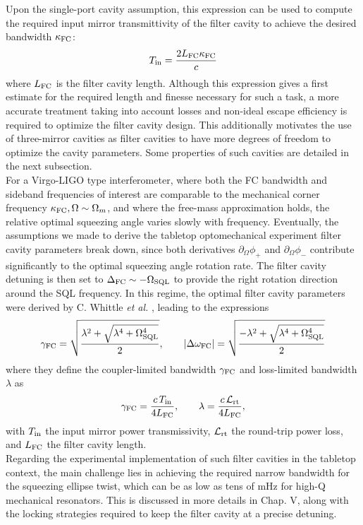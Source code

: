 Upon the single-port cavity assumption, this expression can be used to compute the required input mirror transmittivity of the filter cavity to achieve the desired bandwidth $\kappa_{\rm FC}$:
\begin{equation}
  T_{\rm in} = \dfrac{2L_{\rm FC} \kappa_{\rm FC}}{c} 
\end{equation}
where $L_{\rm FC}$ is the filter cavity length. Although this expression gives a first estimate for the required length and finesse necessary for such a task, a more accurate treatment taking into account losses and non-ideal escape efficiency is required to optimize the filter cavity design. This additionally motivates the use of three-mirror cavities as filter cavities to have more degrees of freedom to optimize the cavity parameters. Some properties of such cavities are detailed in the next subsection. \\

For a Virgo-LIGO type interferometer, where both the FC bandwidth and sideband frequencies of interest are comparable to the mechanical corner frequency $\kappa_{\rm FC}, \Omega \sim \Omega_m$, and where the free-mass approximation holds, the relative optimal squeezing angle varies slowly with frequency. Eventually, the assumptions we made to derive the tabletop optomechanical experiment filter cavity parameters break down, since both derivatives $\partial_\Omega \phi_+$ and $\partial_\Omega \phi_-$ contribute significantly to the optimal squeezing angle rotation rate. The filter cavity detuning is then set to $\Delta_{\rm FC} \sim - \Omega_{\rm SQL}$ to provide the right rotation direction around the SQL frequency. In this regime, the optimal filter cavity parameters were derived by C. Whittle \textit{et al.} \cite{whittle_optimal_2020}, leading to the expressions
\begin{equation}
\gamma_\text{FC}=\sqrt{\frac{\lambda^2+\sqrt{\lambda^4+\Omega_{\rm SQL}^4}}{2}},\qquad
|\Delta\omega_{\rm FC}|=\sqrt{\frac{-\lambda^2+\sqrt{\lambda^4+\Omega_{\rm SQL}^4}}{2}}
\end{equation}
where they define the coupler-limited bandwidth $\gamma_{\rm FC}$ and loss-limited bandwidth $\lambda$ as
\[\gamma_{\rm FC}=\frac{c\,T_{\rm in}}{4L_{\rm FC}},\qquad \lambda=\frac{c\,\mathcal{L}_{\rm rt}}{4L_{\rm FC}},\]
with $T_{\rm in}$ the input mirror power transmissivity, $\mathcal{L}_{\rm rt}$ the round-trip power loss, and $L_{\rm FC}$ the filter cavity length. \\ 

Regarding the experimental implementation of such filter cavities in the tabletop context, the main challenge lies in achieving the required narrow bandwidth for the squeezing ellipse twist, which can be as low as tens of mHz for high-Q mechanical resonators. This is discussed in more details in Chap. V, along with the locking strategies required to keep the filter cavity at a precise detuning. 


